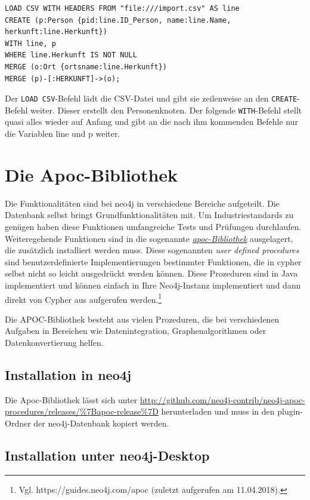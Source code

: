 \documentclass[ngerman,]{scrreprt}
\begin{document}
\begin{verbatim}
LOAD CSV WITH HEADERS FROM "file:///import.csv" AS line
CREATE (p:Person {pid:line.ID_Person, name:line.Name, herkunft:line.Herkunft})
WITH line, p
WHERE line.Herkunft IS NOT NULL
MERGE (o:Ort {ortsname:line.Herkunft})
MERGE (p)-[:HERKUNFT]->(o);
\end{verbatim}

Der \texttt{LOAD\ CSV}-Befehl lädt die CSV-Datei und gibt sie zeilenweise an den \texttt{CREATE}-Befehl weiter. Dieser erstellt den Personenknoten. Der folgende \texttt{WITH}-Befehl stellt quasi alles wieder auf Anfang und gibt an die nach ihm kommenden Befehle nur die Variablen line und p weiter.

\section{Die Apoc-Bibliothek}\label{die-apoc-bibliothek}

Die Funktionalitäten sind bei neo4j in verschiedene Bereiche aufgeteilt. Die Datenbank selbst bringt Grundfunktionalitäten mit. Um Industriestandards zu genügen haben diese Funktionen umfangreiche Tests und Prüfungen durchlaufen. Weiteregehende Funktionen sind in die sogenannte \href{https://guides.neo4j.com/apoc}{\emph{apoc-Bibliothek}} ausgelagert, die zusätzlich installiert werden muss. Diese sogenannten \emph{user defined procedures} sind benutzerdefinierte Implementierungen bestimmter Funktionen, die in cypher selbst nicht so leicht ausgedrückt werden können. Diese Prozeduren sind in Java implementiert und können einfach in Ihre Neo4j-Instanz implementiert und dann direkt von Cypher aus aufgerufen werden.\footnote{Vgl. https://guides.neo4j.com/apoc (zuletzt aufgerufen am 11.04.2018).}

Die APOC-Bibliothek besteht aus vielen Prozeduren, die bei verschiedenen Aufgaben in Bereichen wie Datenintegration, Graphenalgorithmen oder Datenkonvertierung helfen.

\subsection{Installation in neo4j}\label{installation-in-neo4j}

Die Apoc-Bibliothek lässt sich unter \url{http://github.com/neo4j-contrib/neo4j-apoc-procedures/releases/\%7Bapoc-release\%7D} herunterladen und muss in den plugin-Ordner der neo4j-Datenbank kopiert werden.

\subsection{Installation unter neo4j-Desktop}\label{installation-unter-neo4j-desktop}
\end{document}
